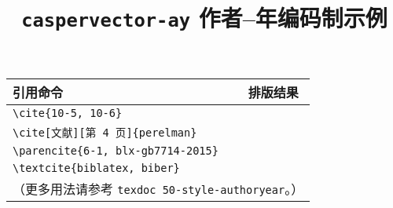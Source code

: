 \documentclass[UTF8]{ctexart}
\begin{document}
\title{\textbf{\texttt{caspervector-ay} 作者--年编码制示例}}
\author{}
\date{}
\maketitle
\vspace*{-1em}

\begin{center}
\begin{tabular}{ll}\hline
引用命令 &	排版结果 \\\hline
\verb|\cite{10-5, 10-6}| &	\cite{10-5, 10-6} \\
\verb|\cite[文献][第 4 页]{perelman}| &	\cite[文献][第 4 页]{perelman} \\
\verb|\parencite{6-1, blx-gb7714-2015}| &	\parencite{6-1, blx-gb7714-2015} \\
\verb|\textcite{biblatex, biber}| &	\textcite{biblatex, biber} \\\hline
\multicolumn{2}{l}{（更多用法请参考 \texttt{texdoc 50-style-authoryear}。）} \\
\end{tabular}
\end{center}

\printbibliography[category = cited, title = {本文参考文献}]
\printbibliography[notcategory = cited, title = {%
	其它参考文献示例
	（引自\texorpdfstring{文献 \parencite{gbt7714-2005}}{ GB/T 7714-2005}）%
}]
\nocite{*}
\end{document}
